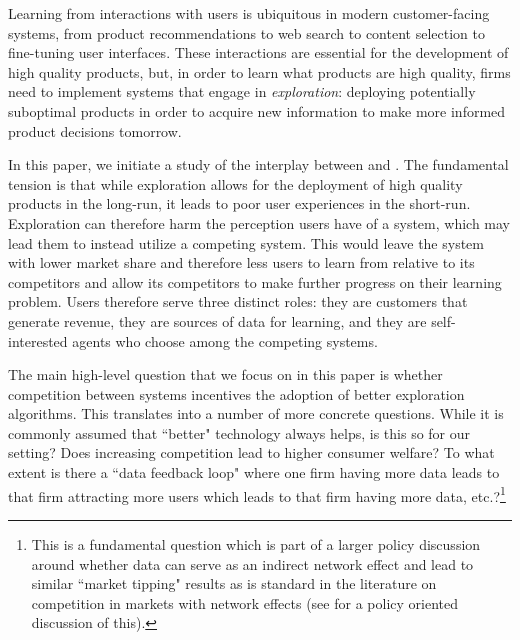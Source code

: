 Learning from interactions with users is ubiquitous in modern customer-facing systems, from product recommendations to web search to content selection to fine-tuning user interfaces. These interactions are essential for the development of high quality products, but, in order to learn what products are high quality, firms need to implement systems that engage in \emph{exploration}: deploying potentially suboptimal products in order to acquire new information to make more informed product decisions tomorrow.

In this paper, we initiate a study of the interplay between \exploration and \competition. The fundamental tension is that while exploration allows for the deployment of high quality products in the long-run, it leads to poor user experiences in the short-run. Exploration can therefore harm the perception users have of a system, which may lead them to instead utilize a competing system. This would leave the system with lower market share and therefore less users to learn from relative to its competitors and allow its competitors to make further progress on their learning problem. Users therefore serve three distinct roles: they are customers that generate revenue, they are sources of data for learning, and they are self-interested agents who choose among the competing systems.

The main high-level question that we focus on in this paper is whether competition between systems incentives the adoption of better exploration algorithms. This translates into a number of more concrete questions. While it is commonly assumed that ``better" technology always helps, is this so for our setting? Does increasing competition lead to higher consumer welfare? To what extent is there a ``data feedback loop" where one firm having more data leads to that firm attracting more users which leads to that firm having more data, etc.?\footnote{This is a fundamental question which is part of a larger policy discussion around whether data can serve as an indirect network effect and lead to similar ``market tipping" results as is standard in the literature on competition in markets with network effects (see \cite{jullien2019economics} for a policy oriented discussion of this).}




